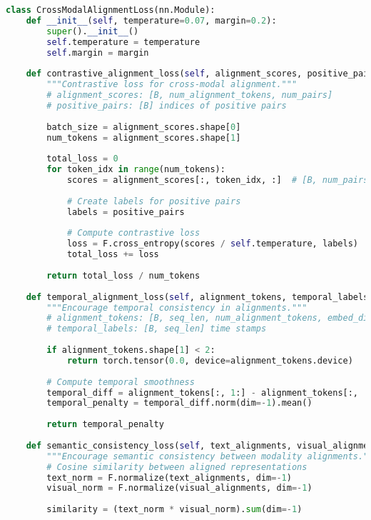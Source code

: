 \begin{lstlisting}[language=Python, caption=Cross-modal alignment training objectives]
class CrossModalAlignmentLoss(nn.Module):
    def __init__(self, temperature=0.07, margin=0.2):
        super().__init__()
        self.temperature = temperature
        self.margin = margin
        
    def contrastive_alignment_loss(self, alignment_scores, positive_pairs):
        """Contrastive loss for cross-modal alignment."""
        # alignment_scores: [B, num_alignment_tokens, num_pairs]
        # positive_pairs: [B] indices of positive pairs
        
        batch_size = alignment_scores.shape[0]
        num_tokens = alignment_scores.shape[1]
        
        total_loss = 0
        for token_idx in range(num_tokens):
            scores = alignment_scores[:, token_idx, :]  # [B, num_pairs]
            
            # Create labels for positive pairs
            labels = positive_pairs
            
            # Compute contrastive loss
            loss = F.cross_entropy(scores / self.temperature, labels)
            total_loss += loss
        
        return total_loss / num_tokens
    
    def temporal_alignment_loss(self, alignment_tokens, temporal_labels):
        """Encourage temporal consistency in alignments."""
        # alignment_tokens: [B, seq_len, num_alignment_tokens, embed_dim]
        # temporal_labels: [B, seq_len] time stamps
        
        if alignment_tokens.shape[1] < 2:
            return torch.tensor(0.0, device=alignment_tokens.device)
        
        # Compute temporal smoothness
        temporal_diff = alignment_tokens[:, 1:] - alignment_tokens[:, :-1]
        temporal_penalty = temporal_diff.norm(dim=-1).mean()
        
        return temporal_penalty
    
    def semantic_consistency_loss(self, text_alignments, visual_alignments):
        """Encourage semantic consistency between modality alignments."""
        # Cosine similarity between aligned representations
        text_norm = F.normalize(text_alignments, dim=-1)
        visual_norm = F.normalize(visual_alignments, dim=-1)
        
        similarity = (text_norm * visual_norm).sum(dim=-1)
        

\end{lstlisting}
